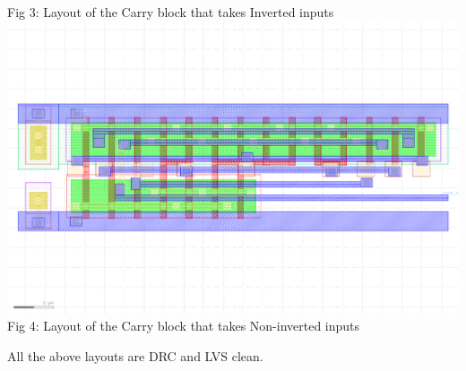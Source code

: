\documentclass[12pt,a4paper]{article}
\begin{document}
\begin{center}
Fig 3: Layout of the Carry block that takes Inverted inputs
\includegraphics[width=0.99\linewidth]{tut6/again/carry_n/carry_n.gds.png} \\
Fig 4: Layout of the Carry block that takes Non-inverted inputs
\end{center}

\noindent All the above layouts are DRC and LVS clean.
\end{document}
